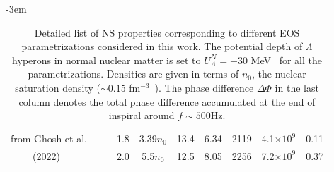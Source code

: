\documentclass[%
 reprint,
 amsmath,amssymb,
 aps,
]{revtex4-2}
\begin{document}
\begin{table}
\begin{adjustwidth}{-3em}{}
\begin{center}
\begin{tabular}{|c|c|c|c|c|c|c|c|c|c|}
    from Ghosh et al.& & & 1.8 & 3.39$n_0$ & 13.4 & 6.34 & 2119 & 4.1$\times 10^9$ & 0.11 \\
    (2022)~\cite{Ghosh_2022}& & & 2.0 & 5.5$n_0$ & 12.5 & 8.05 & 2256 & 7.2$\times 10^9$ & 0.37 \\
    \hline
    \end{tabular} 
\end{center}
\end{adjustwidth}
    \caption{Detailed list of NS properties corresponding to different EOS parametrizations considered in this work. The potential depth of $\Lambda$ hyperons in normal nuclear matter is set to $U_{\Lambda}^N = -30 $ MeV~\cite{Weissenborn_2012} for all the parametrizations. Densities are given in terms of $n_0$, the nuclear saturation density ($\sim 0.15 $ fm$^{-3}$~\cite{Oertel2017}). The phase difference $\Delta\Phi$ in the last column denotes the total phase difference accumulated at the end of inspiral around $f \sim 500$Hz.}
    \label{tab:table1}
\end{table}
\end{document}

